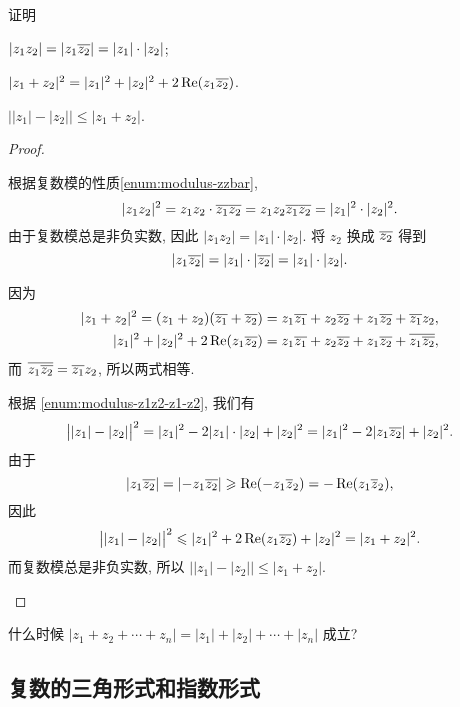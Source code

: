 \begin{example}
  证明
  \begin{enumnopar}[(i)]
    \item $|z_1z_2|=|z_1\overline{z_2}|=|z_1|\cdot|z_2|$;
    \label{enum:modulus-z1z2-z1-z2}
    \item $|z_1+z_2|^2=|z_1|^2+|z_2|^2+2\operatorname{Re}(z_1\overline{z_2})$.
    \item $\bigl||z_1|-|z_2|\bigr|\le|z_1+z_2|$.
  \end{enumnopar}
\end{example}

\begin{proof}
  \begin{enumnopar}[(i)]
    \item 根据复数模的性质\ref{enum:modulus-zzbar},
    \[|z_1z_2|^2=z_1z_2\cdot\overline{z_1}\overline{z_2}
    =z_1z_2\overline{z_1}\overline{z_2}=|z_1|^2\cdot|z_2|^2.\]
    由于复数模总是非负实数, 因此 $|z_1z_2|=|z_1|\cdot|z_2|$.
    将 $z_2$ 换成 $\overline{z_2}$ 得到
    \[|z_1\overline{z_2}|=|z_1|\cdot|\overline{z_2}|=|z_1|\cdot|z_2|.\]
    \item 因为
    \begin{align*}
        |z_1+z_2|^2
       =(z_1+z_2)(\overline{z_1}+\overline{z_2})
      &=z_1\overline{z_1}+z_2\overline{z_2}+z_1\overline{z_2}+\overline{z_1}z_2,\\
        |z_1|^2+|z_2|^2+2\operatorname{Re}(z_1\overline{z_2})
      &=z_1\overline{z_1}+z_2\overline{z_2}+z_1\overline{z_2}+\overline{z_1\overline{z_2}},
    \end{align*}
    而 $\overline{z_1\overline{z_2}}=\overline{z_1}z_2$, 所以两式相等.
    \item 根据 \ref{enum:modulus-z1z2-z1-z2}, 我们有
      \[\bigl||z_1|-|z_2|\bigr|^2=|z_1|^2-2|z_1|\cdot|z_2|+|z_2|^2=|z_1|^2-2|z_1 \overline{z_2}|+|z_2|^2.\]
      由于
      \[|z_1\overline{z_2}|=|{-z_1\overline{z_2}}|\geqslant\operatorname{Re}(-z_1\overline z_2)=-\operatorname{Re}(z_1\overline z_2),\]
      因此
      \[\bigl||z_1|-|z_2|\bigr|^2\leqslant |z_1|^2+2\operatorname{Re}(z_1 \overline{z_2})+|z_2|^2=|z_1+z_2|^2.\]
      而复数模总是非负实数, 所以 $\bigl||z_1|-|z_2|\bigr|\le|z_1+z_2|$.
  \end{enumnopar}
\end{proof}

\begin{exercise}
  什么时候 $|z_1+z_2+\cdots+z_n|=|z_1|+|z_2|+\cdots+|z_n|$ 成立?
\end{exercise}



\subsection{复数的三角形式和指数形式}

